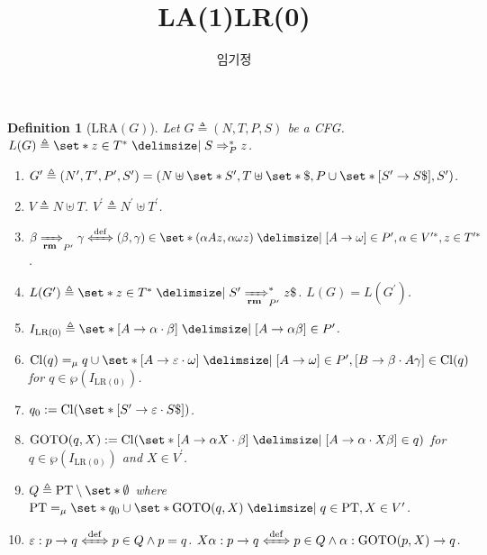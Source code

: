\documentclass[12pt]{article}
\title{LA(1)LR(0)}
\author{임기정}
\newtheorem{definition}[theorem]{Definition}
\newcommand{\powerset}
{ \wp }
\begin{document}
\thispagestyle{empty}

\begin{definition}[$\mathrm{LRA}(G)$]
Let $G \triangleq ( N , T , P , S )$ be a CFG. $L ( G ) \triangleq \set*{ z \in { T }^\ast \mid S \Rightarrow_{P}^\ast z }$.
\begin{enumerate} \setlength{\itemsep}{0.2pt} \setlength{\parskip}{0.2pt}
\item[$\mathrm{(i)}$] $G^\prime \triangleq ( N^\prime , T^\prime , P^\prime , S^\prime ) = ( N \uplus \set*{ S^\prime } , T \uplus \set*{ \$ } , P \cup \set*{ [ S^\prime \to S \$ ] } , S^\prime )$.
\item[$\mathrm{(ii)}$] $V \triangleq N \uplus T$. $V^\prime \triangleq N^\prime \uplus T^\prime$.
\item[$\mathrm{(iii)}$] $\beta \xRightarrow[\mathbf{rm}]{}_{P^\prime} \gamma \xLeftrightarrow[]{\mathrm{def}} ( \beta , \gamma ) \in \set*{ ( \alpha A z , \alpha \omega z ) \mid [ A \to \omega ] \in P^\prime , \alpha \in V^{\prime \ast}, z \in T^{\prime \ast} }$.
\item[$\mathrm{(iv)}$] $L ( G^\prime ) \triangleq \set*{ z \in { T }^\ast \mid S^\prime \xRightarrow[\mathbf{rm}]{}_{P^\prime}^\ast z \$ }$. $L ( G ) = L ( G^\prime )$.
\item[$\mathrm{(v)}$] $I_{\mathrm{LR(0)}} \triangleq \set*{ [ A \to \alpha \cdot \beta ] \mid [ A \to \alpha \beta ] \in P^\prime }$.
\item[$\mathrm{(vi)}$] $\mathrm{Cl} ( q ) =_\mu q \cup \set*{ [ A \to \varepsilon \cdot \omega ] \mid [ A \to \omega ] \in P^\prime , [ B \to \beta \cdot A \gamma ] \in \mathrm{Cl} ( q ) }$ for $ q \in \powerset ( I_{\mathrm{LR(0)}} ) $.
\item[$\mathrm{(vii)}$] $q_0 := \mathrm{Cl} ( \set*{ [ S^\prime \to \varepsilon \cdot S \$ ] } )$.
\item[$\mathrm{(viii)}$] $\mathrm{GOTO} ( q , X ) := \mathrm{Cl} ( \set*{ [ A \to \alpha X \cdot \beta ] \mid [ A \to \alpha \cdot X \beta ] \in q } )$ for $q \in \powerset ( I_{\mathrm{LR(0)}} )$ and $X \in V^\prime$.
\item[$\mathrm{(ix)}$] $Q \triangleq \mathrm{PT} \setminus \set*{ \emptyset }$ where $\mathrm{PT} =_\mu \set*{ q_0 } \cup \set*{ \mathrm{GOTO} ( q , X ) \mid q \in \mathrm{PT} , X \in V^\prime }$.
\item[$\mathrm{(x)}$] $\varepsilon : p \to q \xLeftrightarrow[]{\mathrm{def}} p \in Q \land p = q$. $X \alpha : p \to q \xLeftrightarrow[]{\mathrm{def}} p \in Q \land \alpha : \mathrm{GOTO} ( p , X ) \to q$.

\end{enumerate}
\end{definition}
\end{document}
